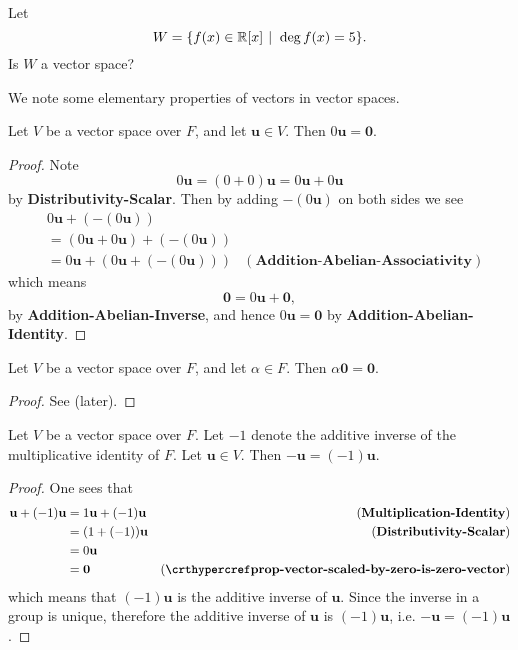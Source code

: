 \begin{exercise}
    Let
    \[
        W = \{f(x) \in \R[x] \vert \deg f(x) = 5\}.
    \]
    Is $W$ a vector space?
\end{exercise}

We note some elementary properties of vectors in vector spaces.

\begin{proposition}\label{prop-vector-scaled-by-zero-is-zero-vector}
    Let $V$ be a vector space over $F$, and let $\mathbf{u} \in V$. Then $0\mathbf{u} = \mathbf{0}$.
\end{proposition}
\begin{proof}
    Note
    \[
        0\mathbf{u} = (0 + 0)\mathbf{u} = 0\mathbf{u} + 0\mathbf{u}
    \]
    by \textbf{Distributivity-Scalar}. Then by adding $-(0\mathbf{u})$ on both sides we see
    \begin{align*}
        &0\mathbf{u} + (-(0\mathbf{u}))\\
        &= (0\mathbf{u} + 0\mathbf{u}) + (-(0\mathbf{u}))\\
        &= 0\mathbf{u} + (0\mathbf{u} + (-(0\mathbf{u}))) & (\textbf{Addition-Abelian-Associativity})
    \end{align*}
    which means
    \[
        \mathbf{0} = 0\mathbf{u} + \mathbf{0},
    \]
    by \textbf{Addition-Abelian-Inverse}, and hence $0\mathbf{u} = \mathbf{0}$ by \textbf{Addition-Abelian-Identity}.
\end{proof}

\begin{proposition}\label{prop-zero-vector-scaled-by-constant-is-zero-vector}
    Let $V$ be a vector space over $F$, and let $\alpha \in F$. Then $\alpha\mathbf{0} = \mathbf{0}$.
\end{proposition}
\begin{proof}
    See  (later).
\end{proof}

\begin{proposition}\label{prop-vector-inverse-is-negative-vector}
    Let $V$ be a vector space over $F$. Let $-1$ denote the additive inverse of the multiplicative identity of $F$. Let $\mathbf{u} \in V$. Then $-\mathbf{u} = (-1)\mathbf{u}$.
\end{proposition}
\begin{proof}
    One sees that
    \begin{align*}
        \mathbf{u} + (-1)\mathbf{u} &= 1\mathbf{u} + (-1)\mathbf{u} & (\textbf{Multiplication-Identity})\\
        &= (1 + (-1))\mathbf{u} & (\textbf{Distributivity-Scalar})\\
        &= 0\mathbf{u}\\
        &= \mathbf{0} & (\myref{prop-vector-scaled-by-zero-is-zero-vector})
    \end{align*}
    which means that $(-1)\mathbf{u}$ is the additive inverse of $\mathbf{u}$. Since the inverse in a group is unique, therefore the additive inverse of $\mathbf{u}$ is $(-1)\mathbf{u}$, i.e. $-\mathbf{u} = (-1)\mathbf{u}$.
\end{proof}

